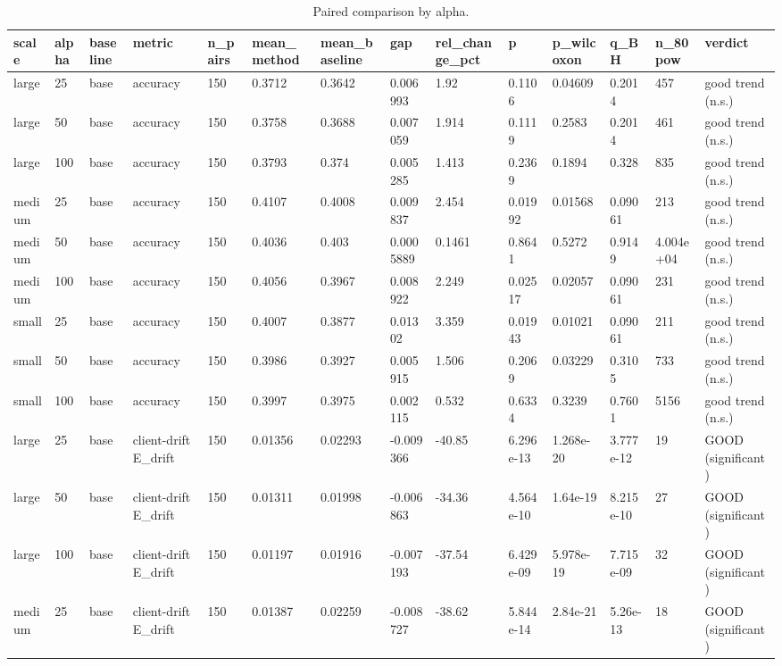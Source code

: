 \begin{table}[t]\centering\footnotesize
\caption{Paired comparison by alpha.}\label{tab:table7_paired_by_alpha}
\begin{tabular}{llllllllllllll}
\toprule
scale & alpha & baseline & metric & n\_pairs & mean\_method & mean\_baseline & gap & rel\_change\_pct & p & p\_wilcoxon & q\_BH & n\_80pow & verdict \\
\midrule
large & 25 & base & accuracy & 150 & 0.3712 & 0.3642 & 0.006993 & 1.92 & 0.1106 & 0.04609 & 0.2014 & 457 & good trend (n.s.) \\
large & 50 & base & accuracy & 150 & 0.3758 & 0.3688 & 0.007059 & 1.914 & 0.1119 & 0.2583 & 0.2014 & 461 & good trend (n.s.) \\
large & 100 & base & accuracy & 150 & 0.3793 & 0.374 & 0.005285 & 1.413 & 0.2369 & 0.1894 & 0.328 & 835 & good trend (n.s.) \\
medium & 25 & base & accuracy & 150 & 0.4107 & 0.4008 & 0.009837 & 2.454 & 0.01992 & 0.01568 & 0.09061 & 213 & good trend (n.s.) \\
medium & 50 & base & accuracy & 150 & 0.4036 & 0.403 & 0.0005889 & 0.1461 & 0.8641 & 0.5272 & 0.9149 & 4.004e+04 & good trend (n.s.) \\
medium & 100 & base & accuracy & 150 & 0.4056 & 0.3967 & 0.008922 & 2.249 & 0.02517 & 0.02057 & 0.09061 & 231 & good trend (n.s.) \\
small & 25 & base & accuracy & 150 & 0.4007 & 0.3877 & 0.01302 & 3.359 & 0.01943 & 0.01021 & 0.09061 & 211 & good trend (n.s.) \\
small & 50 & base & accuracy & 150 & 0.3986 & 0.3927 & 0.005915 & 1.506 & 0.2069 & 0.03229 & 0.3105 & 733 & good trend (n.s.) \\
small & 100 & base & accuracy & 150 & 0.3997 & 0.3975 & 0.002115 & 0.532 & 0.6334 & 0.3239 & 0.7601 & 5156 & good trend (n.s.) \\
large & 25 & base & client-drift E\_drift & 150 & 0.01356 & 0.02293 & -0.009366 & -40.85 & 6.296e-13 & 1.268e-20 & 3.777e-12 & 19 & GOOD (significant) \\
large & 50 & base & client-drift E\_drift & 150 & 0.01311 & 0.01998 & -0.006863 & -34.36 & 4.564e-10 & 1.64e-19 & 8.215e-10 & 27 & GOOD (significant) \\
large & 100 & base & client-drift E\_drift & 150 & 0.01197 & 0.01916 & -0.007193 & -37.54 & 6.429e-09 & 5.978e-19 & 7.715e-09 & 32 & GOOD (significant) \\
medium & 25 & base & client-drift E\_drift & 150 & 0.01387 & 0.02259 & -0.008727 & -38.62 & 5.844e-14 & 2.84e-21 & 5.26e-13 & 18 & GOOD (significant) \\

\end{tabular}
\end{table}
